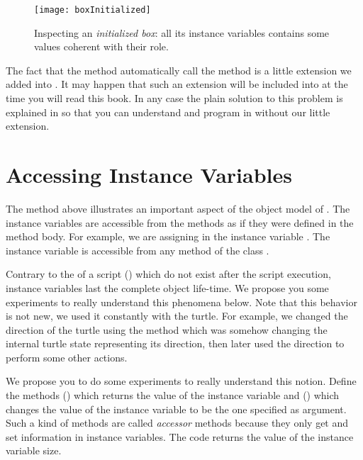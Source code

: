 \begin{figure}
\begin{center}
\texttt{[image: boxInitialized]}
\caption{Inspecting an \emph{initialized box}: all its instance variables 
contains some values coherent with their role.\label{fig:initializedBox}}
\end{center}
\end{figure}

\begin{readerNote}
The fact that the  method automatically call the 
method is a little extension we added into \sq.  It may happen that
such an extension will be included into \sq at the time you will read
this book.  In any case the plain \sq solution to this problem is
explained in  so that you can
understand and program in \sq without our little extension.
\end{readerNote}







\section{Accessing Instance Variables}
The method  above illustrates an important aspect of
the object model of \sq.  The instance variables are accessible from
the methods as if they were defined in the method body. For example, 
we are assigning  in the instance variable . The instance 
variable  is accessible from any method of the class .

Contrary to the   of a
script  () which do not exist after the script execution, instance
variables last the complete object life-time.  We propose you some
experiments to really understand this phenomena below.  Note that this
behavior is not new, we used it constantly with the turtle.  For
example, we changed the direction of the turtle using the method
 which was somehow changing the internal turtle state representing its direction, then later used the direction to perform some other actions.

We propose you to do some experiments to really understand this notion. 
Define the methods  () which returns the value 
of the instance variable  and  
() which changes the value of 
the instance variable  to be the one specified as argument. Such a kind of methods are called \emph{accessor} methods because they only get and set information in instance variables. 
The code  returns the value of the instance variable size.

